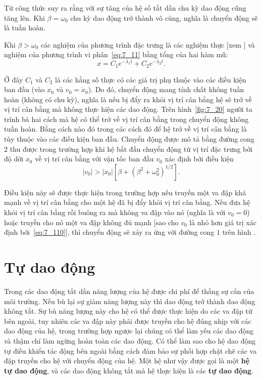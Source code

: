 Từ công thức  suy ra rằng với sự tăng của hệ số tắt dần chu kỳ dao động cũng tăng lên. Khi $\beta=\omega_0$ chu kỳ dao động trở thành vô cùng, nghĩa là chuyển động sẽ là tuần hoàn.

Khi $\beta>\omega_0$ các nghiệm của phương trình đặc trưng là các nghiệm thực [xem ] và nghiệm của phương trình vi phân~\eqref{eq:7_11} bằng tổng của hai hàm mũ:
\begin{equation*}
	x = C_1e^{-\lambda_1 t} + C_2e^{-\lambda_2 t}.
\end{equation*}

\noindent
Ở đây $C_1$ và $C_2$ là các hằng số thực có các giá trị phụ thuộc vào các điều kiện ban đầu (vào $x_0$ và $v_0=\dot{x}_0$). Do đó, chuyển động mang tính chất không tuần hoàn (không có chu kỳ), nghĩa là nếu bị đẩy ra khỏi vị trí cân bằng hệ sẽ trở về vị trí cân bằng mà không thực hiện các dao động. Trên hình~\ref{fig:7_20} người ta trình bà hai cách mà hệ có thể trở về vị trí cân bằng trong chuyển động không tuần hoàn. Bằng cách nào đó trong các cách đó để hệ trở về vị trí cân bằng là tùy thuộc vào các điều kiện ban đầu. Chuyển động được mô tả bằng đường cong $2$ thu được trong trường hợp khi hệ bắt đầu chuyển động từ vị trí đặc trưng bởi độ dời $x_0$ về vị trí cân bằng với vận tốc ban đầu $v_0$ xác định bởi điều kiện
\begin{equation}\label{eq:7_110}
	|v_0| > |x_0|\left[\beta + \left(\beta^2 + \omega_0^2\right)^{1/2}\right].
\end{equation}

\noindent
Điều kiện này sẽ được thực hiện trong trường hợp nếu truyền một va đập khá mạnh về vị trí cân bằng cho một hệ đã bị đẩy khỏi vị trí cân bằng. Nếu đưa hệ khỏi vị trí cân bằng rồi buông ra mà không va đập vào nó (nghĩa là với $v_0=0$) hoặc truyền cho nó một va đập không đủ mạnh [sao cho $v_0$ là nhỏ hơn giá trị xác định bởi~\eqref{eq:7_110}], thì chuyển động sẽ xảy ra ứng với đường cong $1$ trên hình .

\section{Tự dao động}\label{sec:7_11}

Trong các dao động tắt dần năng lượng của hệ được chi phí để thắng sự cẳn của môi trường. Nếu bù lại sự giảm năng lượng này thì dao động trở thành dao động không tắt. Sự bù năng lượng này cho hệ có thể được thực hiện do các va đập từ bên ngoài, tuy nhiên các va đập này phải được truyền cho hệ đúng nhịp với các dao động của hệ, trong trường hợp ngược lại chúng có thể làm yếu các dao động và thậm chí làm ngừng hoàn toàn các dao động. Có thể làm sao cho hệ dao động tự điều khiển tác động bên ngoài bằng cách đảm bảo sự phối hợp chặt chẽ các va đập truyền cho hệ với chuyển động của hệ. Một hệ như vậy được gọi là một \textbf{hệ tự dao động}, và các dao động không tắt mà hệ thực hiện là các \textbf{tự dao động}.

